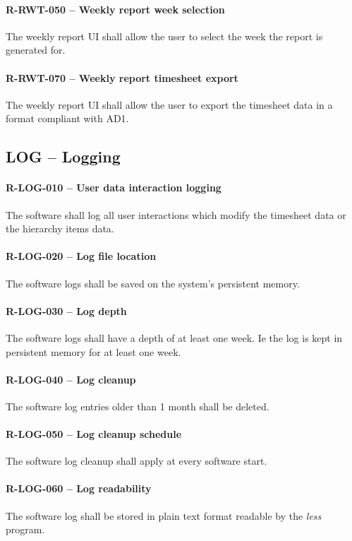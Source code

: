\paragraph{R-RWT-050 -- Weekly report week selection}
The weekly report UI shall allow the user to select the week the report is
generated for.

\paragraph{R-RWT-070 -- Weekly report timesheet export}
The weekly report UI shall allow the user to export the timesheet data in
a format compliant with AD1.

\subsection{LOG -- Logging}
\paragraph{R-LOG-010 -- User data interaction logging}
The software shall log all user interactions which modify the timesheet
data or the hierarchy items data.

\paragraph{R-LOG-020 -- Log file location}
The software logs shall be saved on the system's persistent memory.

\paragraph{R-LOG-030 -- Log depth}
The software logs shall have a depth of at least one week. Ie the
log is kept in persistent memory for at least one week.

\paragraph{R-LOG-040 -- Log cleanup}
The software log entries older than 1 month shall be deleted.

\paragraph{R-LOG-050 -- Log cleanup schedule}
The software log cleanup shall apply at every software start.

\paragraph{R-LOG-060 -- Log readability}
The software log shall be stored in plain text format readable
by the \emph{less} program.

